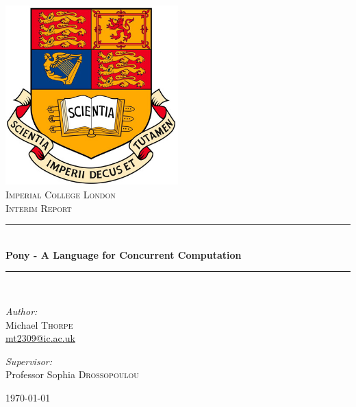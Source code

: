 \documentclass[11pt,a4paper]{report}
\newcommand{\HRule}{\rule{\linewidth}{0.5mm}}
\begin{document}
\begin{titlepage}

\begin{center}

\includegraphics[width=0.50\textwidth]{imperial_crest_colour.jpg}\\[1cm]

\textsc{\LARGE Imperial College London}\\[1.5cm]

\textsc{\Large Interim Report}\\[0.5cm]


\HRule \\[0.4cm]
{ \huge \bfseries Pony - A Language for Concurrent Computation}\\[0.4cm]

\HRule \\[1.5cm]

\begin{minipage}{0.4\textwidth}
\begin{flushleft} \large
\emph{Author:}\\
Michael \textsc{Thorpe}\\
\href{mailto:mt2309@ic.ac.uk}{mt2309@ic.ac.uk}
\end{flushleft}
\end{minipage}
\begin{minipage}{0.4\textwidth}
\begin{flushright} \large
\emph{Supervisor:} \\
Professor Sophia \textsc{Drossopoulou}
\end{flushright}
\end{minipage}

\vfill

{\large \today}

\end{center}

\end{titlepage}
\end{document}
